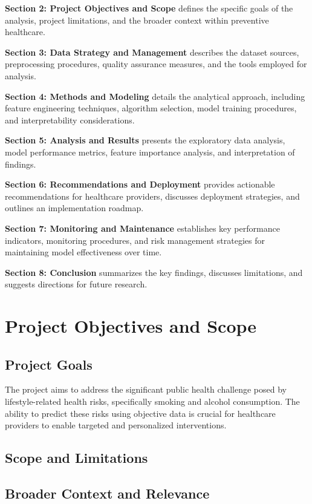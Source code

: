 \documentclass[11pt,a4paper]{article}
\begin{document}
\noindent \textbf{Section 2: Project Objectives and Scope} defines the specific goals of the analysis, project limitations, and the broader context within preventive healthcare.

\noindent \textbf{Section 3: Data Strategy and Management} describes the dataset sources, preprocessing procedures, quality assurance measures, and the tools employed for analysis.

\noindent \textbf{Section 4: Methods and Modeling} details the analytical approach, including feature engineering techniques, algorithm selection, model training procedures, and interpretability considerations.

\noindent \textbf{Section 5: Analysis and Results} presents the exploratory data analysis, model performance metrics, feature importance analysis, and interpretation of findings.

\noindent \textbf{Section 6: Recommendations and Deployment} provides actionable recommendations for healthcare providers, discusses deployment strategies, and outlines an implementation roadmap.

\noindent \textbf{Section 7: Monitoring and Maintenance} establishes key performance indicators, monitoring procedures, and risk management strategies for maintaining model effectiveness over time.

\noindent \textbf{Section 8: Conclusion} summarizes the key findings, discusses limitations, and suggests directions for future research.

\section{Project Objectives and Scope}

\subsection{Project Goals}
\noindent The project aims to address the significant public health challenge posed by lifestyle-related health risks, specifically smoking and alcohol consumption. The ability to predict these risks using objective data is crucial for healthcare providers to enable targeted and personalized interventions.

\subsection{Scope and Limitations}

\subsection{Broader Context and Relevance}
\end{document}
